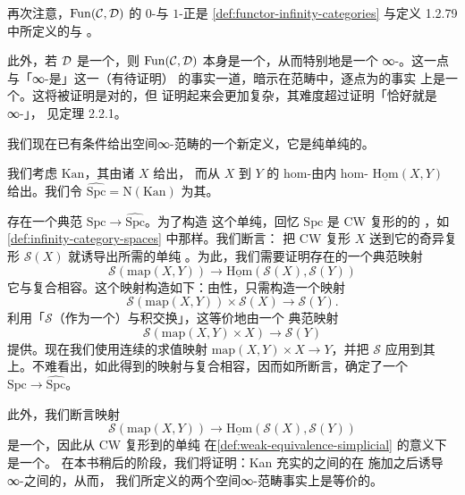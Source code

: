 \begin{observation}\label{obs:fun-simplices}
再次注意，$\mathrm{Fun}(\mathcal{C}, \mathcal{D})$ 的 $0$-\trSimplex{}与 $1$-\trSimplex{}正是%
\cref{def:functor-infinity-categories} 与定义 1.2.79 中所定义的\trFunctor{}与%
\trNaturalTransformation{}。

此外，若 $\mathcal{D}$ 是一个\trKanComplex{}，则
$\mathrm{Fun}(\mathcal{C}, \mathcal{D})$ 本身是一个\trKanComplex{}，从而特别地是一个
∞-\trGroupoid{}。这一点与「∞-\trGroupoid{}是\trKanComplex{}」这一（有待证明）
的事实一道，暗示在\trFunctor{}范畴中，逐点为\trEquivalence{}的\trMorphism{}事实
上是一个\trEquivalence{}。这将被证明是对的，但
证明起来会更加复杂，其难度超过证明「\trKanComplex{}恰好就是∞-\trGroupoid{}」，
见定理 2.2.1。
\end{observation}

我们现在已有条件给出空间∞-范畴的一个新定义，它是纯单纯的。

\begin{definition}\label{def:spc-hat}
我们考虑\trSimplicialCategory{} $\mathrm{Kan}$，其\trObject{}由诸\trKanComplex{} $X$ 给出，
而从 $X$ 到 $Y$ 的 hom-\trSimplicialSet{}由内 hom-\trSimplicialSet{}%
$\underline{\mathrm{Hom}}(X, Y)$ 给出。我们令
$\widehat{\mathrm{Spc}} = \mathrm{N}(\mathrm{Kan})$ 为其\trCoherentNerve{}。
\end{definition}

\begin{observation}\label{obs:canonical-spc-hat}
存在一个典范\trFunctor{} $\mathrm{Spc} \to \widehat{\mathrm{Spc}}$。为了构造
这个单纯\trFunctor{}，回忆 $\mathrm{Spc}$ 是 CW 复形的\trSimplicialCategory{}的%
\trCoherentNerve{}，如\cref{def:infinity-category-spaces} 中那样。我们断言：
把 CW 复形 $X$ 送到它的奇异复形 $\mathcal{S}(X)$ 就诱导出所需的单纯%
\trFunctor{}。为此，我们需要证明存在\trSimplicialSet{}的一个典范映射
\[
\mathcal{S}(\mathrm{map}(X, Y)) \to
\underline{\mathrm{Hom}}(\mathcal{S}(X), \mathcal{S}(Y))
\]
它与复合相容。这个映射构造如下：由\trAdjunction{}性，只需构造一个映射
\[
\mathcal{S}(\mathrm{map}(X, Y)) \times \mathcal{S}(X) \to \mathcal{S}(Y).
\]
利用「$\mathcal{S}$（作为一个\trRightAdjoint{}）与积交换」，这等价地由一个
典范映射
\[
\mathcal{S}(\mathrm{map}(X, Y) \times X) \to \mathcal{S}(Y)
\]
提供。现在我们使用连续的求值映射
$\mathrm{map}(X, Y) \times X \to Y$，并把\trFunctor{} $\mathcal{S}$ 应用到其
上。不难看出，如此得到的映射与复合相容，因而如所断言，确定了一个\trFunctor{}%
$\mathrm{Spc} \to \widehat{\mathrm{Spc}}$。
\end{observation}

\begin{observation}\label{obs:spc-hat-weak-equivalence}
此外，我们断言映射
\[
\mathcal{S}(\mathrm{map}(X, Y)) \to
\underline{\mathrm{Hom}}(\mathcal{S}(X), \mathcal{S}(Y))
\]
是一个\trWeakEquivalence{}，因此从 CW 复形到\trKanComplex{}的单纯\trFunctor{}%
在\cref{def:weak-equivalence-simplicial} 的意义下是一个\trWeakEquivalence{}。
在本书稍后的阶段，我们将证明：Kan 充实的\trSimplicialCategory{}之间的\trWeakEquivalence{}在
施加\trCoherentNerve{}之后诱导∞-\trCategories{}之间的\trEquivalence{}，从而，
我们所定义的两个空间∞-范畴事实上是等价的。
\end{observation}


